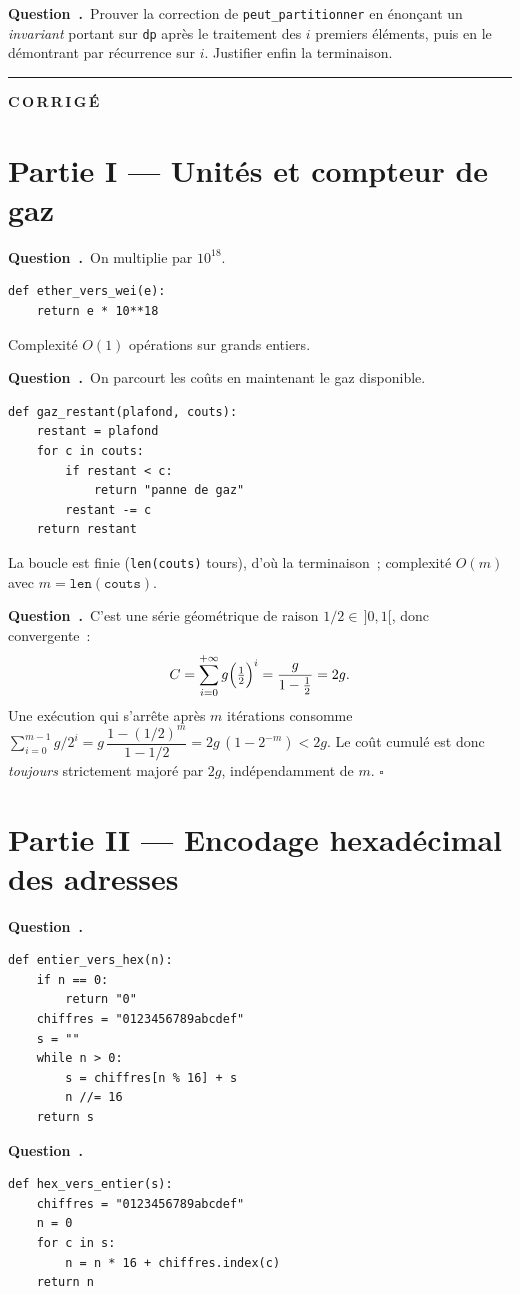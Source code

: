 \documentclass[11pt,a4paper]{article}
\newcounter{qcnt}
\newcommand{\Q}{\medskip\par\stepcounter{qcnt}\noindent\textbf{Question~\theqcnt.}~}
\newcommand{\code}[1]{\lstinline!#1!}
\begin{document}
\Q Prouver la correction de \code{peut_partitionner} en énonçant un \emph{invariant} portant sur
\code{dp} après le traitement des $i$ premiers éléments, puis en le démontrant par récurrence sur
$i$. Justifier enfin la terminaison.

\newpage
\setcounter{qcnt}{0}
\bigskip
\hrule
\bigskip
{\Large\bfseries C\,O\,R\,R\,I\,G\,É}
\medskip

\section*{Partie I --- Unités et compteur de gaz}

\Q On multiplie par $10^{18}$.
\begin{lstlisting}
def ether_vers_wei(e):
    return e * 10**18
\end{lstlisting}
Complexité $O(1)$ opérations sur grands entiers.

\Q On parcourt les coûts en maintenant le gaz disponible.
\begin{lstlisting}
def gaz_restant(plafond, couts):
    restant = plafond
    for c in couts:
        if restant < c:
            return "panne de gaz"
        restant -= c
    return restant
\end{lstlisting}
La boucle est finie (\code{len(couts)} tours), d'où la terminaison~; complexité $O(m)$ avec
$m = \mathtt{len(couts)}$.

\Q C'est une série géométrique de raison $1/2 \in\, ]0,1[$, donc convergente~:
$$ C = \sum_{i=0}^{+\infty} g\Bigl(\tfrac12\Bigr)^{i} = \frac{g}{1 - \tfrac12} = 2g. $$
Une exécution qui s'arrête après $m$ itérations consomme
$\sum_{i=0}^{m-1} g/2^{i} = g\,\dfrac{1-(1/2)^{m}}{1-1/2} = 2g\,(1 - 2^{-m}) < 2g.$
Le coût cumulé est donc \emph{toujours} strictement majoré par $2g$, indépendamment de $m$.
$\square$

\section*{Partie II --- Encodage hexadécimal des adresses}

\Q
\begin{lstlisting}
def entier_vers_hex(n):
    if n == 0:
        return "0"
    chiffres = "0123456789abcdef"
    s = ""
    while n > 0:
        s = chiffres[n % 16] + s
        n //= 16
    return s
\end{lstlisting}

\Q
\begin{lstlisting}
def hex_vers_entier(s):
    chiffres = "0123456789abcdef"
    n = 0
    for c in s:
        n = n * 16 + chiffres.index(c)
    return n
\end{lstlisting}
\end{document}

